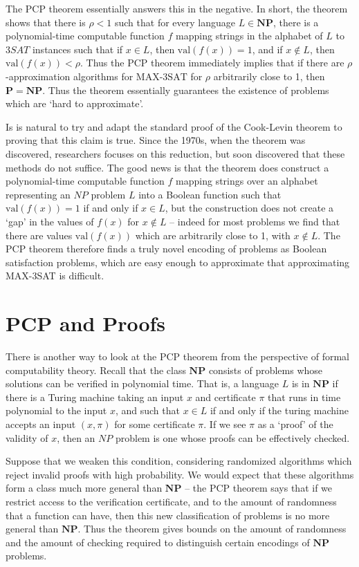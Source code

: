 The PCP theorem essentially answers this in the negative. In short, the theorem shows that there is $\rho < 1$ such that for every language $L \in \mathbf{NP}$, there is a polynomial-time computable function $f$ mapping strings in the alphabet of $L$ to $3SAT$ instances such that if $x \in L$, then $\text{val}(f(x)) = 1$, and if $x \not \in L$, then $\text{val}(f(x)) < \rho$. Thus the PCP theorem immediately implies that if there are $\rho$-approximation algorithms for $\text{MAX-3SAT}$ for $\rho$ arbitrarily close to 1, then $\mathbf{P} = \mathbf{NP}$. Thus the theorem essentially guarantees the existence of problems which are `hard to approximate'.

Is is natural to try and adapt the standard proof of the Cook-Levin theorem to proving that this claim is true. Since the 1970s, when the theorem was discovered, researchers focuses on this reduction, but soon discovered that these methods do not suffice. The good news is that the theorem does construct a polynomial-time computable function $f$ mapping strings over an alphabet representing an $NP$ problem $L$ into a Boolean function such that $\text{val}(f(x)) = 1$ if and only if $x \in L$, but the construction does not create a `gap' in the values of $f(x)$ for $x \not \in L$ -- indeed for most problems we find that there are values $\text{val}(f(x))$ which are arbitrarily close to 1, with $x \not \in L$. The PCP theorem therefore finds a truly novel encoding of problems as Boolean satisfaction problems, which are easy enough to approximate that approximating MAX-3SAT is difficult.

\section{PCP and Proofs}

There is another way to look at the PCP theorem from the perspective of formal computability theory. Recall that the class $\mathbf{NP}$ consists of problems whose solutions can be verified in polynomial time. That is, a language $L$ is in $\mathbf{NP}$ if there is a Turing machine taking an input $x$ and certificate $\pi$ that runs in time polynomial to the input $x$, and such that $x \in L$ if and only if the turing machine accepts an input $(x, \pi)$ for some certificate $\pi$. If we see $\pi$ as a `proof' of the validity of $x$, then an $NP$ problem is one whose proofs can be effectively checked.

Suppose that we weaken this condition, considering randomized algorithms which reject invalid proofs with high probability. We would expect that these algorithms form a class much more general than $\mathbf{NP}$ -- the PCP theorem says that if we restrict access to the verification certificate, and to the amount of randomness that a function can have, then this new classification of problems is no more general than $\mathbf{NP}$. Thus the theorem gives bounds on the amount of randomness and the amount of checking required to distinguish certain encodings of $\mathbf{NP}$ problems.

